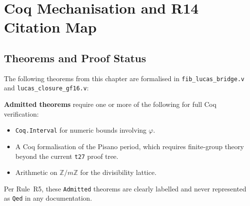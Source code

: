 \section{Coq Mechanisation and R14 Citation Map}
\label{sec:gh-coq}

\subsection{Theorems and Proof Status}
\label{subsec:gh-coq-theorems}

The following theorems from this chapter are formalised in
\texttt{fib\_lucas\_bridge.v} and \texttt{lucas\_closure\_gf16.v}:

\begin{center}
\end{center}

\noindent\textbf{Admitted theorems} require one or more of the following
for full Coq verification:
\begin{itemize}
  \item \texttt{Coq.Interval} for numeric bounds involving \(\varphi\).
  \item A Coq formalisation of the Pisano period, which requires
        finite-group theory beyond the current \texttt{t27} proof tree.
  \item Arithmetic on \(\mathbb{Z}/m\mathbb{Z}\) for the divisibility lattice.
\end{itemize}
Per Rule~R5, these \texttt{Admitted} theorems are clearly labelled
and never represented as \texttt{Qed} in any documentation.

